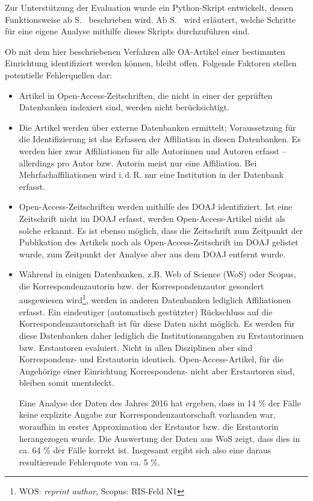 Zur Unterstützung der Evaluation wurde ein Python-Skript entwickelt, dessen Funktionsweise ab S.~\pageref{funktionsweise} beschrieben wird. Ab S.~\pageref{analysis} wird erläutert, welche Schritte für eine eigene Analyse mithilfe dieses Skripts durchzuführen sind.

Ob mit dem hier beschriebenen Verfahren alle OA-Artikel einer bestimmten Einrichtung identifiziert werden können, bleibt offen. Folgende Faktoren stellen potentielle Fehlerquellen dar:
\begin{itemize}
\item Artikel in Open-Access-Zeitschriften, die nicht in einer der geprüften Datenbanken indexiert sind, werden nicht berücksichtigt.
\item Die Artikel werden über externe Datenbanken ermittelt; Voraussetzung für die Identifizierung ist das Erfassen der Affiliation in diesen Datenbanken. Es werden hier zwar Affiliationen für alle Autorinnen und Autoren erfasst -- allerdings pro Autor bzw. Autorin meist nur eine Affiliation. Bei Mehrfachaffiliationen wird i.\,d.\,R. nur eine Institution in der Datenbank erfasst.
\item Open-Access-Zeitschriften werden mithilfe des DOAJ identifiziert. Ist eine Zeitschrift nicht im DOAJ erfasst, werden Open-Access-Artikel nicht als solche erkannt. Es ist ebenso möglich, dass die Zeitschrift zum Zeitpunkt der Publikation des Artikels noch als Open-Access-Zeitschrift im DOAJ gelistet wurde, zum Zeitpunkt der Analyse aber aus dem DOAJ entfernt wurde.
\item Während in einigen Datenbanken, z.B. Web of Science (WoS) oder Scopus, die Korrespondenzautorin bzw. der Korrespondenzautor gesondert ausgewiesen wird\footnote{WOS: \textit{reprint author}, Scopus: RIS-Feld N1}, werden in anderen Datenbanken lediglich Affiliationen erfasst. Ein eindeutiger (automatisch gestützter) Rückschluss auf die Korrespondenzautorschaft ist für diese Daten nicht möglich. Es werden für diese Datenbanken daher lediglich die Institutionsangaben zu Erstautorinnen bzw. Erstautoren evaluiert. Nicht in allen Disziplinen aber sind Korrespondenz- und Erstautorin identisch. Open-Access-Artikel, für die Angehörige einer Einrichtung Korrespondenz- nicht aber Erstautoren sind, bleiben somit unentdeckt.

Eine Analyse der Daten des Jahres 2016 hat ergeben, dass in 14 \% der Fälle keine explizite Angabe zur Korrespondenzautorschaft vorhanden war, woraufhin in erster Approximation der Erstautor bzw. die Erstautorin herangezogen wurde. Die Auswertung der Daten aus WoS zeigt, dass dies in ca. 64 \% der Fälle korrekt ist. Insgesamt ergibt sich also eine daraus resultierende Fehlerquote von ca. 5 \%.
\end{itemize}
